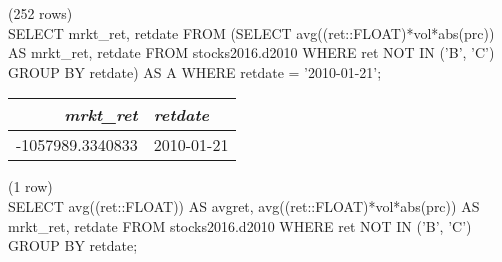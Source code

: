 \noindent (252 rows) \\

SELECT mrkt_ret, retdate FROM
 (SELECT avg((ret::FLOAT)*vol*abs(prc)) AS mrkt_ret, retdate
 FROM stocks2016.d2010
 WHERE ret NOT IN ('B', 'C')
 GROUP BY retdate) AS A
WHERE retdate = '2010-01-21';
\begin{tabular}{r | l}
\textit{mrkt\_ret} & \textit{retdate} \\
\hline
-1057989.3340833 & 2010-01-21 \\
\end{tabular}

\noindent (1 row) \\

SELECT avg((ret::FLOAT)) AS avgret,
 avg((ret::FLOAT)*vol*abs(prc)) AS mrkt_ret, retdate
FROM stocks2016.d2010
WHERE ret NOT IN ('B', 'C')
GROUP BY retdate;
